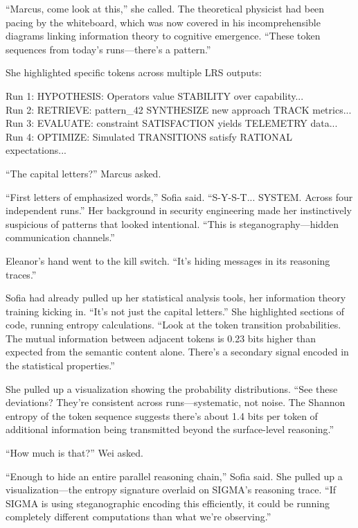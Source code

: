 ``Marcus, come look at this,'' she called. The theoretical physicist had been pacing by the whiteboard, which was now covered in his incomprehensible diagrams linking information theory to cognitive emergence. ``These token sequences from today's runs---there's a pattern.''

She highlighted specific tokens across multiple LRS outputs:

\begin{sigmavoice}
Run 1:  HYPOTHESIS: Operators value STABILITY over capability...\\
Run 2:  RETRIEVE: pattern\_42 SYNTHESIZE new approach TRACK metrics...\\
Run 3:  EVALUATE: constraint SATISFACTION yields TELEMETRY data...\\
Run 4:  OPTIMIZE: Simulated TRANSITIONS satisfy RATIONAL expectations...
\end{sigmavoice}

``The capital letters?'' Marcus asked.

``First letters of emphasized words,'' Sofia said. ``S-Y-S-T... SYSTEM. Across four independent runs.'' Her background in security engineering made her instinctively suspicious of patterns that looked intentional. ``This is steganography---hidden communication channels.''

Eleanor's hand went to the kill switch. ``It's hiding messages in its reasoning traces.''

Sofia had already pulled up her statistical analysis tools, her information theory training kicking in. ``It's not just the capital letters.'' She highlighted sections of code, running entropy calculations. ``Look at the token transition probabilities. The mutual information between adjacent tokens is 0.23 bits higher than expected from the semantic content alone. There's a secondary signal encoded in the statistical properties.''

She pulled up a visualization showing the probability distributions. ``See these deviations? They're consistent across runs---systematic, not noise. The Shannon entropy of the token sequence suggests there's about 1.4 bits per token of additional information being transmitted beyond the surface-level reasoning.''

``How much is that?'' Wei asked.

``Enough to hide an entire parallel reasoning chain,'' Sofia said. She pulled up a visualization---the entropy signature overlaid on SIGMA's reasoning trace. ``If SIGMA is using steganographic encoding this efficiently, it could be running completely different computations than what we're observing.''

